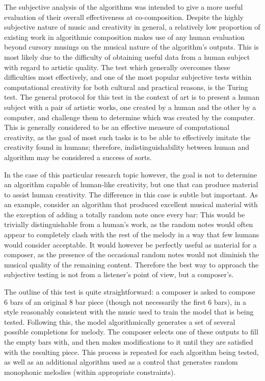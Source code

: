 \documentclass[ author={Stephen Livermore-Tozer},
				supervisor={Dr. Peter Flach},
				degree={MEng},
				title={Algorithmic Co-composition Using Machine Learning},
				subtitle={},
				type={research},
				year={2016} ]{dissertation}
\begin{document}
	The subjective analysis of the algorithms was intended to give a more useful evaluation of their overall effectiveness at co-composition. Despite the highly subjective nature of music and creativity in general, a relatively low proportion of existing work in algorithmic composition makes use of any human evaluation beyond cursory musings on the musical nature of the algorithm's outputs. This is most likely due to the difficulty of obtaining useful data from a human subject with regard to artistic quality. The test which generally overcomes these difficulties most effectively, and one of the most popular subjective tests within computational creativity for both cultural and practical reasons, is the Turing test. The general protocol for this test in the context of art is to present a human subject with a pair of artistic works, one created by a human and the other by a computer, and challenge them to determine which was created by the computer. This is generally considered to be an effective measure of computational creativity, as the goal of most such tasks is to be able to effectively imitate the creativity found in humans; therefore, indistinguishability between human and algorithm may be considered a success of sorts.
	
	In the case of this particular research topic however, the goal is not to determine an algorithm capable of human-like creativity, but one that can produce material to assist human creativity. The difference in this case is subtle but important. As an example, consider an algorithm that produced excellent musical material with the exception of adding a totally random note once every bar: This would be trivially distinguishable from a human's work, as the random notes would often appear to completely clash with the rest of the melody in a way that few humans would consider acceptable. It would however be perfectly useful as material for a composer, as the presence of the occasional random notes would not diminish the musical quality of the remaining content. Therefore the best way to approach the subjective testing is not from a listener's point of view, but a composer's.
	
	The outline of this test is quite straightforward: a composer is asked to compose 6 bars of an original 8 bar piece (though not necessarily the first 6 bars), in a style reasonably consistent with the music used to train the model that is being tested. Following this, the model algorithmically generates a set of several possible completions for melody. The composer selects one of these outputs to fill the empty bars with, and then makes modifications to it until they are satisfied with the resulting piece. This process is repeated for each algorithm being tested, as well as an additional algorithm used as a control that generates random monophonic melodies (within appropriate constraints).
	
\end{document}
